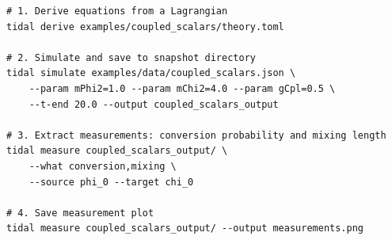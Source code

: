 \begin{lstlisting}[style=bash]
# 1. Derive equations from a Lagrangian
tidal derive examples/coupled_scalars/theory.toml

# 2. Simulate and save to snapshot directory
tidal simulate examples/data/coupled_scalars.json \
    --param mPhi2=1.0 --param mChi2=4.0 --param gCpl=0.5 \
    --t-end 20.0 --output coupled_scalars_output

# 3. Extract measurements: conversion probability and mixing length
tidal measure coupled_scalars_output/ \
    --what conversion,mixing \
    --source phi_0 --target chi_0

# 4. Save measurement plot
tidal measure coupled_scalars_output/ --output measurements.png
\end{lstlisting}
